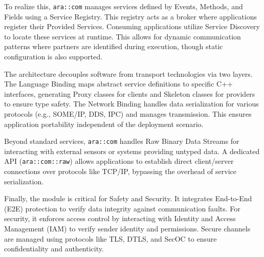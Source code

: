 To realize this, \texttt{ara::com} manages services defined by Events, Methods, and Fields using a {Service Registry}. This registry acts as a broker where applications register their Provided Services. Consuming applications utilize {Service Discovery} to locate these services at runtime. This allows for dynamic communication patterns where partners are identified during execution, though static configuration is also supported.

The architecture decouples software from transport technologies via two layers. The {Language Binding} maps abstract service definitions to specific C++ interfaces, generating Proxy classes for clients and Skeleton classes for providers to ensure type safety. The {Network Binding} handles data serialization for various protocols (e.g., SOME/IP, DDS, IPC) and manages transmission. This ensures application portability independent of the deployment scenario.

Beyond standard services, \texttt{ara::com} handles {Raw Binary Data Streams} for interacting with external sensors or systems providing untyped data. A dedicated API (\texttt{ara::com::raw}) allows applications to establish direct client/server connections over protocols like TCP/IP, bypassing the overhead of service serialization.

Finally, the module is critical for {Safety and Security}. It integrates End-to-End (E2E) protection to verify data integrity against communication faults. For security, it enforces access control by interacting with Identity and Access Management (IAM) to verify sender identity and permissions. Secure channels are managed using protocols like TLS, DTLS, and SecOC to ensure confidentiality and authenticity.



